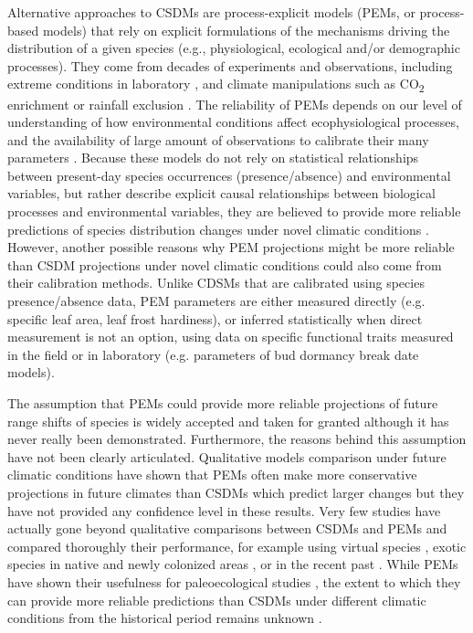 Alternative approaches to CSDMs are process-explicit models (PEMs, or process-based models) that rely on explicit formulations of the mechanisms driving the distribution of a given species (e.g., physiological, ecological and/or demographic processes). They come from decades of experiments and observations, including extreme conditions in laboratory \citep{Seehausen2017}, and climate manipulations such as CO\textsubscript{2} enrichment \citep{Jiang2020} or rainfall exclusion \citep{Gavinet2019}. The reliability of PEMs depends on our level of understanding of how environmental conditions affect ecophysiological processes, and the availability of large amount of observations to calibrate their many parameters \citep{Evans2016}. Because these models do not rely on statistical relationships between present-day species occurrences (presence/absence) and environmental variables, but rather describe explicit causal relationships between biological processes and environmental variables, they are believed to provide more reliable predictions of species distribution changes under novel climatic conditions  \citep{Evans2012, Singer2016}. However, another possible reasons why PEM projections might be more reliable than CSDM projections under novel climatic conditions could also come from their calibration methods. Unlike CDSMs that are calibrated using species presence/absence data, PEM parameters are either measured directly (e.g. specific leaf area, leaf frost hardiness), or inferred statistically when direct measurement is not an option, using data on specific functional traits measured in the field or in laboratory (e.g. parameters of bud dormancy break date models). 

The assumption that PEMs could provide more reliable projections of future range shifts of species is widely accepted and taken for granted \citep{Evans2012, Connolly2017, Urban2016, Pilowsky2022} although it has never really been demonstrated.
Furthermore,  the reasons behind this assumption have not been clearly articulated. Qualitative models comparison under future climatic conditions have shown that PEMs often make more conservative projections in future climates than CSDMs which predict larger changes \citep{Morin2009, Cheaib2012, Gritti2013} but they have not provided any confidence level in these results. Very few studies have actually gone beyond qualitative comparisons between CSDMs and PEMs and compared thoroughly their performance, for example using virtual species \citep{Zurell2016}, exotic species in native and newly colonized areas \citep{Higgins2020}, or in the recent past \citep{Fordham2018}. 
While PEMs have shown their usefulness for paleoecological studies \citep{Saltre2013, Ruosch2016, Schwoerer2014}, the extent to which they can provide more reliable predictions than CSDMs under different climatic conditions from the historical period remains unknown \citep{UribeRivera2023, Briscoe2019}. 

